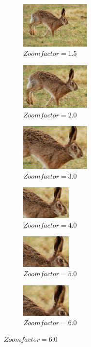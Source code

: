 \begin{figure}[H]
    \begin{subfigure}{0.3\textwidth}
      \centering
      \includegraphics[width=35mm]{obrazky/cropStentiford1_5zajic6.jpg}
      \caption{$Zoom factor = 1.5$}
    \end{subfigure}
    \begin{subfigure}{0.3\textwidth}
      \centering
      \includegraphics[width=35mm]{obrazky/cropStentiford2zajic6.jpg}
      \caption{$Zoom factor = 2.0$}
    \end{subfigure}
    \begin{subfigure}{0.3\textwidth}
      \centering
      \includegraphics[width=35mm]{obrazky/cropStentiford3zajic6.jpg}
      \caption{$Zoom factor = 3.0$}
    \end{subfigure}
    \vspace{2pt}
    
    \begin{subfigure}{0.3\textwidth}
      \centering
      \includegraphics[width=25mm]{obrazky/cropStentiford4zajic6.jpg}
      \caption{$Zoom factor = 4.0$}
    \end{subfigure}
    \begin{subfigure}{0.3\textwidth}
      \centering
      \includegraphics[width=25mm]{obrazky/cropStentiford5zajic6.jpg}
      \caption{$Zoom factor = 5.0$}
    \end{subfigure}
    \begin{subfigure}{0.3\textwidth}
      \centering
      \includegraphics[width=25mm]{obrazky/cropStentiford6zajic6.jpg}
      \caption{$Zoom factor = 6.0$}
    \end{subfigure}
    

\end{figure}
